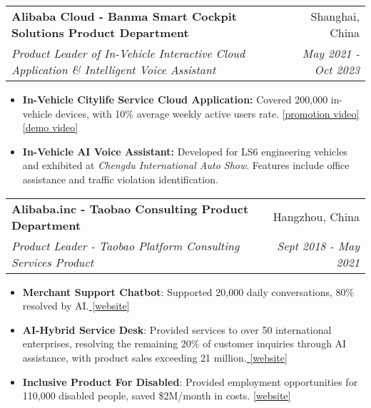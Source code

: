 \documentclass[letterpaper,11pt]{article}
\makeatletter
\newcommand{\resumeSubheading}[4]{
  \vspace{-3pt}\item
    \begin{tabular*}{0.97\textwidth}{l@{\extracolsep{\fill}}r}
      \textbf{#1} & #2 \\
      \textit{\small#3} & \textit{\small #4} \\
    \end{tabular*}\vspace{-8pt}
}
\newcommand{\resumeItemListStart}{\begin{itemize}}
\newcommand{\resumeItemListEnd}{\end{itemize}\vspace{-8pt}}
\makeatother
\begin{document}
  \resumeSubheading
      {Alibaba Cloud - Banma Smart Cockpit Solutions Product Department }{Shanghai, China} {Product Leader of In-Vehicle Interactive Cloud Application \& Intelligent Voice Assistant}{May 2021 - Oct 2023}
      \resumeItemListStart
      \item {{\textbf{In-Vehicle Citylife Service Cloud Application:}}}
      {Covered 200,000 in-vehicle devices, with 10\% average weekly active users rate. \href{https://bmgw.oss-cn-shanghai.aliyuncs.com/%E5%AA%92%E4%BD%93%E8%B5%84%E6%96%99%E5%BA%93/%E5%AA%92%E4%BD%93%E8%B5%84%E6%96%99%E5%BA%932-%20%E7%82%B9%E5%92%96%E5%95%A1.mp4}{[promotion video]}\href{https://bmgw.oss-cn-shanghai.aliyuncs.com/%E5%AA%92%E4%BD%93%E8%B5%84%E6%96%99%E5%BA%93/%E5%AA%92%E4%BD%93%E8%B5%84%E6%96%99%E5%BA%933-%20%E5%8A%A0%E6%B2%B9.mp4}{ [demo video]}}
      \vspace{-5pt}
       \item {\textbf{In-Vehicle AI Voice Assistant:}} 
      {Developed for LS6 engineering vehicles and exhibited at \textit{Chengdu International Auto Show}. Features include office assistance and traffic violation identification. }
      \resumeItemListEnd

\vspace{5pt}
 \resumeSubheading
      {Alibaba.inc - Taobao Consulting Product Department
}{Hangzhou, China} {Product Leader - Taobao Platform Consulting Services Product}{Sept 2018 - May 2021}
      \resumeItemListStart
      \item {{\textbf{Merchant Support Chatbot}:}}
      {Supported 20,000 daily conversations, 80\% resolved by AI.\href{https://xixikf.com/}{ [website]}}
          \vspace{-5pt}
       \item {{\textbf{AI-Hybrid Service Desk}:}}
      {Provided services to over 50 international enterprises, resolving the remaining 20\% of customer inquiries through AI assistance, with product sales exceeding 21 million.\href{    https://xixikf.com/xixi.htm#/customer-service}{ [website]}}
        \vspace{-5pt}
       \item {{\textbf{Inclusive Product For Disabled}:}}
      {Provided employment opportunities for 110,000 disabled people, saved \$2M/month in costs. \href{https://baike.baidu.com/item/%E9%98%BF%E9%87%8C%E5%B7%B4%E5%B7%B4%E4%BA%91%E5%AE%A2%E6%9C%8D/52704969?fr=ge_ala}{[website]}}
      \resumeItemListEnd

\vspace{5pt}
\end{document}
